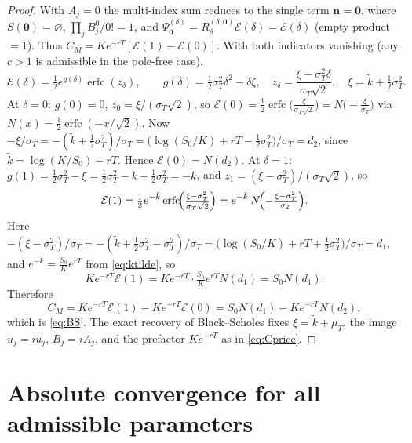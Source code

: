 \documentclass[11pt]{article}
\DeclareMathOperator{\erfc}{erfc}
\begin{document}
\begin{proof}
With $A_j=0$ the multi-index sum reduces to the single term
$\mathbf n=\mathbf0$, where $S(\mathbf0)=\varnothing$,
$\prod_jB_j^{0}/0!=1$, and $\Psi^{(\delta)}_{\mathbf0}
=R^{(\delta,\mathbf0)}_\delta\mathcal E(\delta)=\mathcal E(\delta)$ (empty
product $=1$). Thus $C_M=K e^{-rT}[\mathcal E(1)-\mathcal E(0)]$. With both
indicators vanishing (any $c>1$ is admissible in the pole-free case),
\begin{equation}\label{eq:BS-pf1}
\mathcal E(\delta)=\tfrac12 e^{g(\delta)}\erfc(z_\delta),\qquad
g(\delta)=\tfrac12\sigma_T^2\delta^2-\delta\xi,\quad
z_\delta=\frac{\xi-\sigma_T^2\delta}{\sigma_T\sqrt2},\quad
\xi=\tilde k+\tfrac12\sigma_T^2.
\end{equation}
At $\delta=0$: $g(0)=0$, $z_0=\xi/(\sigma_T\sqrt2)$, so
$\mathcal E(0)=\tfrac12\erfc\!\bigl(\tfrac{\xi}{\sigma_T\sqrt2}\bigr)
=N\!\bigl(-\tfrac{\xi}{\sigma_T}\bigr)$ via $N(x)=\tfrac12\erfc(-x/\sqrt2)$.
Now $-\xi/\sigma_T=-(\tilde k+\tfrac12\sigma_T^2)/\sigma_T
=\bigl(\log(S_0/K)+rT-\tfrac12\sigma_T^2\bigr)/\sigma_T=d_2$, since
$\tilde k=\log(K/S_0)-rT$. Hence $\mathcal E(0)=N(d_2)$.
At $\delta=1$: $g(1)=\tfrac12\sigma_T^2-\xi=\tfrac12\sigma_T^2-\tilde k
-\tfrac12\sigma_T^2=-\tilde k$, and $z_1=(\xi-\sigma_T^2)/(\sigma_T\sqrt2)$,
so
\begin{equation}\label{eq:BS-pf2}
\mathcal E(1)=\tfrac12 e^{-\tilde k}\erfc\!\Bigl(\tfrac{\xi-\sigma_T^2}
{\sigma_T\sqrt2}\Bigr)=e^{-\tilde k}\,N\!\Bigl(-\tfrac{\xi-\sigma_T^2}
{\sigma_T}\Bigr).
\end{equation}
Here $-(\xi-\sigma_T^2)/\sigma_T=-(\tilde k+\tfrac12\sigma_T^2-\sigma_T^2)/
\sigma_T=\bigl(\log(S_0/K)+rT+\tfrac12\sigma_T^2\bigr)/\sigma_T=d_1$, and
$e^{-\tilde k}=\tfrac{S_0}{K}e^{rT}$ from \eqref{eq:ktilde}, so
\[
K e^{-rT}\mathcal E(1)=K e^{-rT}\cdot\tfrac{S_0}{K}e^{rT}N(d_1)=S_0 N(d_1).
\]
Therefore
\[
C_M=K e^{-rT}\mathcal E(1)-K e^{-rT}\mathcal E(0)=S_0 N(d_1)-K e^{-rT}N(d_2),
\]
which is \eqref{eq:BS}. The exact recovery of Black--Scholes fixes
$\xi=\tilde k+\mu_T$, the image $\hat u_j=iu_j$, $B_j=iA_j$, and the
prefactor $K e^{-rT}$ as in \eqref{eq:Cprice}.
\end{proof}

\section{Absolute convergence for all admissible parameters}\label{sec:absconv}
\end{document}
